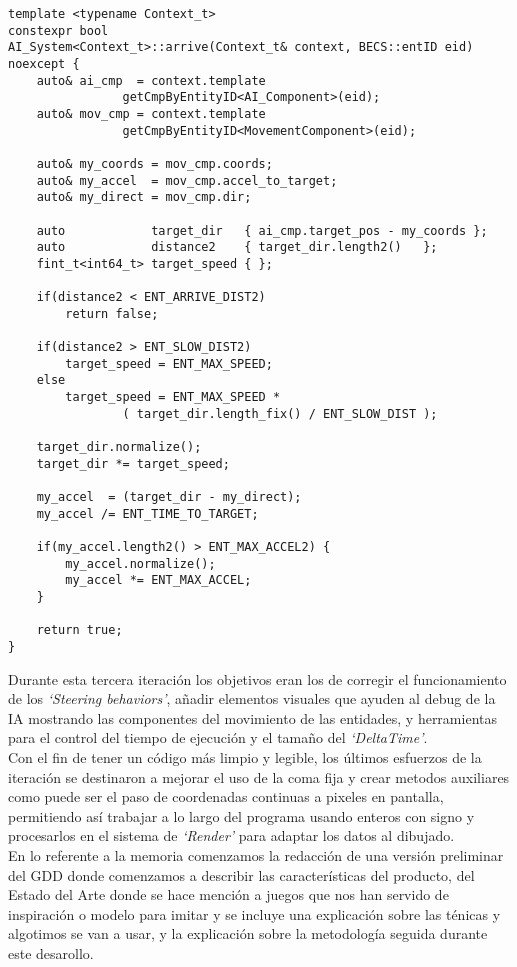 \begin{lstlisting}[style=CodigoC++, caption={Arrive behavior},label=ia_arrive]
template <typename Context_t>
constexpr bool
AI_System<Context_t>::arrive(Context_t& context, BECS::entID eid) noexcept {
    auto& ai_cmp  = context.template 
    			getCmpByEntityID<AI_Component>(eid);
    auto& mov_cmp = context.template 
    			getCmpByEntityID<MovementComponent>(eid);
    
    auto& my_coords = mov_cmp.coords;
    auto& my_accel  = mov_cmp.accel_to_target;
    auto& my_direct = mov_cmp.dir;

    auto            target_dir   { ai_cmp.target_pos - my_coords };
    auto            distance2    { target_dir.length2()   };
    fint_t<int64_t> target_speed { };

    if(distance2 < ENT_ARRIVE_DIST2)
        return false;

    if(distance2 > ENT_SLOW_DIST2)
        target_speed = ENT_MAX_SPEED;
    else
        target_speed = ENT_MAX_SPEED * 
        		( target_dir.length_fix() / ENT_SLOW_DIST );
    
    target_dir.normalize();
    target_dir *= target_speed;

    my_accel  = (target_dir - my_direct);
    my_accel /= ENT_TIME_TO_TARGET;

    if(my_accel.length2() > ENT_MAX_ACCEL2) {
        my_accel.normalize();
        my_accel *= ENT_MAX_ACCEL;
    }

    return true;
}
\end{lstlisting}

\placeholdertext{\%--}

Durante esta tercera iteración los objetivos eran los de corregir el funcionamiento de los
\textit{`Steering behaviors'}, añadir elementos visuales que ayuden al debug de la \ac{IA}
mostrando las componentes del movimiento de las entidades, y herramientas para el control del
tiempo de ejecución y el tamaño del \textit{`DeltaTime'}.\\
Con el fin de tener un código más limpio y legible, los últimos esfuerzos de la iteración se
destinaron a mejorar el uso de la coma fija y crear metodos auxiliares como puede ser el paso de
coordenadas continuas a pixeles en pantalla, permitiendo así trabajar a lo largo del programa 
usando enteros con signo y procesarlos en el sistema de \textit{`Render'} para adaptar los datos
al dibujado.\\
En lo referente a la memoria comenzamos la redacción de una versión preliminar del \ac{GDD}
donde comenzamos a describir las características del producto, del Estado del Arte donde se hace
mención a juegos que nos han servido de inspiración o modelo para imitar y se incluye una explicación
sobre las ténicas y algotimos se van a usar, y la explicación sobre la metodología seguida durante
este desarollo. 

